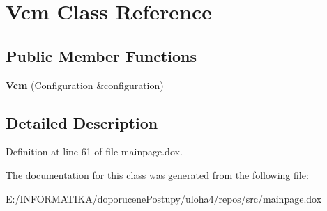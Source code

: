 \hypertarget{class_vcm}{}\section{Vcm Class Reference}
\label{class_vcm}
\subsection*{Public Member Functions}
\begin{DoxyCompactItemize}
\item 
{\bfseries Vcm} (Configuration \&configuration)\hypertarget{class_vcm_afc417c95813c24d1ace5024c1200147d}{}\label{class_vcm_afc417c95813c24d1ace5024c1200147d}

\end{DoxyCompactItemize}


\subsection{Detailed Description}


Definition at line 61 of file mainpage.\+dox.



The documentation for this class was generated from the following file\+:\begin{DoxyCompactItemize}
\item 
E\+:/\+I\+N\+F\+O\+R\+M\+A\+T\+I\+K\+A/doporucene\+Postupy/uloha4/repos/src/mainpage.\+dox\end{DoxyCompactItemize}
